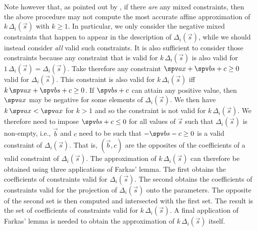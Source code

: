 Note however that, as pointed out by ,
if there \emph{are} any mixed constraints, then the above procedure may
not compute the most accurate affine approximation of
$k \, \Delta_i(\vec s)$ with $k \ge 1$.
In particular, we only consider the negative mixed constraints that
happen to appear in the description of $\Delta_i(\vec s)$, while we
should instead consider \emph{all} valid such constraints.
It is also sufficient to consider those constraints because any
constraint that is valid for $k \, \Delta_i(\vec s)$ is also
valid for $1 \, \Delta_i(\vec s) = \Delta_i(\vec s)$.
Take therefore any constraint
$\spv a x + \spv b s + c \ge 0$ valid for $\Delta_i(\vec s)$.
This constraint is also valid for $k \, \Delta_i(\vec s)$ iff
$k \, \spv a x + \spv b s + c \ge 0$.
If $\spv b s + c$ can attain any positive value, then $\spv a x$
may be negative for some elements of $\Delta_i(\vec s)$.
We then have $k \, \spv a x < \spv a x$ for $k > 1$ and so the constraint
is not valid for $k \, \Delta_i(\vec s)$.
We therefore need to impose $\spv b s + c \le 0$ for all values
of $\vec s$ such that $\Delta_i(\vec s)$ is non-empty, i.e.,
$\vec b$ and $c$ need to be such that $- \spv b s - c \ge 0$ is a valid
constraint of $\Delta_i(\vec s)$.  That is, $(\vec b, c)$ are the opposites
of the coefficients of a valid constraint of $\Delta_i(\vec s)$.
The approximation of $k \, \Delta_i(\vec s)$ can therefore be obtained
using three applications of Farkas' lemma.  The first obtains the coefficients
of constraints valid for $\Delta_i(\vec s)$.  The second obtains
the coefficients of constraints valid for the projection of $\Delta_i(\vec s)$
onto the parameters.  The opposite of the second set is then computed
and intersected with the first set.  The result is the set of coefficients
of constraints valid for $k \, \Delta_i(\vec s)$.  A final application
of Farkas' lemma is needed to obtain the approximation of
$k \, \Delta_i(\vec s)$ itself.

